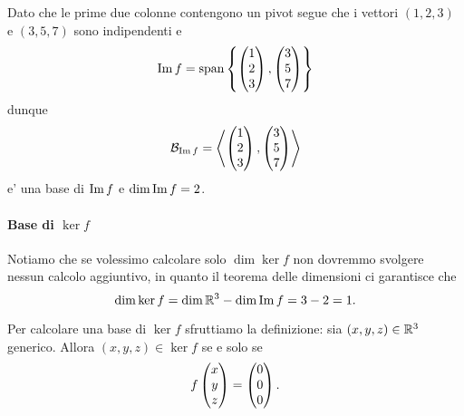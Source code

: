 \begin{example}
    Dato che le prime due colonne contengono un pivot segue che i vettori $(1, 2, 3)$ e $(3, 5, 7)$ sono indipendenti e \[
        \operatorname{Im}f = \operatorname{span}\left\{\begin{pmatrix} 1\\2\\3 \end{pmatrix}, \begin{pmatrix} 3\\5\\7 \end{pmatrix}\right\}    
    \] dunque \[
        \mathcal{B}_{\operatorname{Im}f} = \left\langle \begin{pmatrix} 1\\2\\3 \end{pmatrix}, \begin{pmatrix} 3\\5\\7 \end{pmatrix} \right\rangle    
    \] e' una base di $\operatorname{Im}f$ e $\dim \operatorname{Im}f = 2$.

    \paragraph{Base di $\ker f$} Notiamo che se volessimo calcolare solo $\dim \ker f$ non dovremmo svolgere nessun calcolo aggiuntivo, in quanto il teorema delle dimensioni ci garantisce che \[
        \dim \ker f = \dim \mathbb{R}^3 - \dim \operatorname{Im}f = 3 - 2 = 1.
    \]

    Per calcolare una base di $\ker f$ sfruttiamo la definizione: sia $(x, y, z) \in \mathbb{R}^3$ generico. Allora $(x, y, z) \in \ker f$ se e solo se \[
        f\begin{pmatrix} x\\y\\z \end{pmatrix} = \begin{pmatrix} 0\\0\\0 \end{pmatrix}.    
    \]


\end{example}
